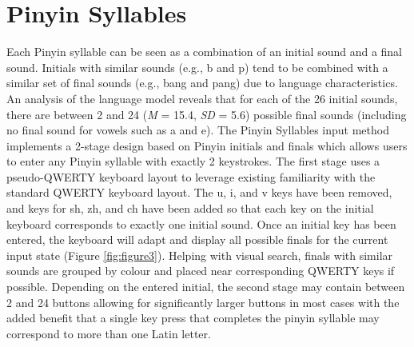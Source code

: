 \section{Pinyin Syllables}
Each Pinyin syllable can be seen as a combination of an initial sound and a final sound. Initials with similar sounds (e.g., b and p) tend to be combined with a similar set of final sounds (e.g., bang and pang) due to language characteristics. An analysis of the language model reveals that for each of the 26 initial sounds, there are between 2 and 24 (\textit{M} = 15.4, \textit{SD} = 5.6) possible final sounds (including no final sound for vowels such as a and e).
The Pinyin Syllables input method implements a 2-stage design based on Pinyin initials and finals which allows users to enter any Pinyin syllable with exactly 2 keystrokes. The first stage uses a pseudo-QWERTY keyboard layout to leverage existing familiarity with the standard QWERTY keyboard layout. The u, i, and v keys have been removed, and keys for sh, zh, and ch have been added so that each key on the initial keyboard corresponds to exactly one initial sound. Once an initial key has been entered, the keyboard will adapt and display all possible finals for the current input state (Figure \ref{fig:figure3}). Helping with visual search, finals with similar sounds are grouped by colour and placed near corresponding QWERTY keys if possible. Depending on the entered initial, the second stage may contain between 2 and 24 buttons allowing for significantly larger buttons in most cases with the added benefit that a single key press that completes the pinyin syllable may correspond to more than one Latin letter.





